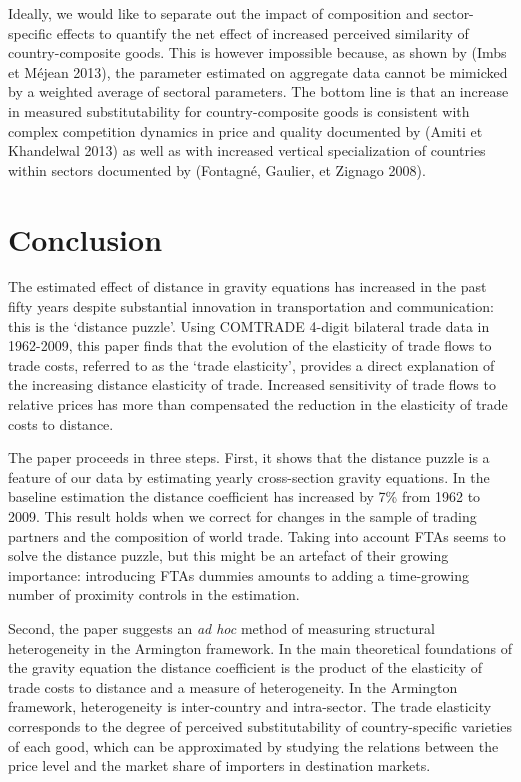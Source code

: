 \documentclass[12pt,twoside,a4paper,notitlepage]{article}
\begin{document}
{Ideally, we would like to separate out the impact of composition and sector-specific effects to quantify the net effect of increased perceived similarity of country-composite goods. This is however impossible because, as shown by (Imbs et M\'{e}jean 2013), the parameter estimated on aggregate data cannot be mimicked by a weighted average of sectoral parameters. The bottom line is that an increase in measured substitutability for country-composite goods is consistent with complex competition dynamics in price and quality documented by (Amiti et Khandelwal 2013) as well as with increased vertical specialization of countries within sectors documented by (Fontagn\'{e}, Gaulier, et Zignago 2008).

\section{Conclusion}

The estimated effect of distance in gravity equations has increased in the past fifty years despite substantial innovation in transportation and communication: this is the `distance puzzle'. Using COMTRADE 4-digit bilateral trade data in 1962-2009, this paper finds that the evolution of the elasticity of trade flows to trade costs, referred to as the `trade elasticity', provides a direct explanation of the increasing distance elasticity of trade. Increased sensitivity of trade flows to relative prices has more than compensated the reduction in the elasticity of trade costs to distance.

The paper proceeds in three steps. First, it shows that the distance puzzle is a feature of our data by estimating yearly cross-section gravity equations. In the baseline estimation the distance coefficient has increased by 7\% from 1962 to 2009. This result holds when we correct for changes in the sample of trading partners and the composition of world trade. Taking into account FTAs seems to solve the distance puzzle, but this might be an artefact of their growing importance: introducing FTAs dummies amounts to adding a time-growing number of proximity controls in the estimation.

Second, the paper suggests an \textit{ad hoc} method of measuring structural heterogeneity in the Armington framework. In the main theoretical foundations of the gravity equation the distance coefficient is the product of the elasticity of trade costs to distance and a measure of heterogeneity. In the Armington framework, heterogeneity is inter-country and intra-sector. The trade elasticity corresponds to the degree of perceived substitutability of country-specific varieties of each good, which can be approximated by studying the relations between the price level and the market share of importers in destination markets.

}
\end{document}
